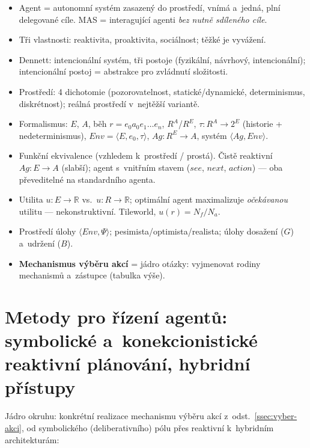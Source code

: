 \documentclass[11pt,a4paper]{article}
\theoremstyle{definition}
\begin{document}
\begin{itemize}
\item Agent = autonomní systém zasazený do prostředí, vnímá a~jedná, plní delegované cíle.
  MAS = interagující agenti \emph{bez nutně sdíleného cíle}.
\item Tři vlastnosti: reaktivita, proaktivita, sociálnost; těžké je vyvážení.
\item Dennett: intencionální systém, tři postoje (fyzikální, návrhový, intencionální);
  intencionální postoj = abstrakce pro zvládnutí složitosti.
\item Prostředí: 4 dichotomie (pozorovatelnost, statické/dynamické, determinismus,
  diskrétnost); reálná prostředí v~nejtěžší variantě.
\item Formalismus: $E$, $A$, běh $r = e_0 a_0 e_1 \dots e_n$, $R^A$/$R^E$,
  $\tau : R^A \to 2^E$ (historie + nedeterminismus),
  $\mathit{Env}=\langle E,e_0,\tau\rangle$, $Ag : R^E \to A$, systém $\langle Ag,\mathit{Env}\rangle$.
\item Funkční ekvivalence (vzhledem k~prostředí / prostá). Čistě reaktivní $Ag: E \to A$
  (slabší); agent s~vnitřním stavem ($\mathit{see}$, $\mathit{next}$, $\mathit{action}$) ---
  oba převeditelné na standardního agenta.
\item Utilita $u : E \to \mathbb{R}$ vs.\ $u : R \to \mathbb{R}$; optimální agent maximalizuje
  \emph{očekávanou} utilitu --- nekonstruktivní. Tileworld, $u(r)=N_f/N_a$.
\item Prostředí úlohy $\langle \mathit{Env}, \Psi\rangle$; pesimista/optimista/realista;
  úlohy dosažení ($G$) a~udržení ($B$).
\item \textbf{Mechanismus výběru akcí} = jádro otázky: vyjmenovat rodiny mechanismů
  a~zástupce (tabulka výše).
\end{itemize}

\section{Metody pro řízení agentů: symbolické a~konekcionistické reaktivní
plánování, hybridní přístupy}
\label{sec:rizeni}

Jádro okruhu: konkrétní realizace mechanismu výběru akcí z~odst.~\ref{ssec:vyber-akci},
od symbolického (deliberativního) pólu přes reaktivní k~hybridním architekturám:
\end{document}
